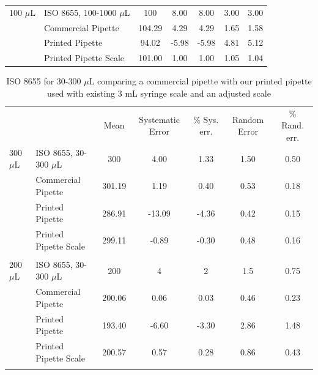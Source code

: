 \documentclass{naturegraphicx}
\begin{document}
\begin{table}
\begin{adjustwidth}{-0.75in}{-1.0in}
\begin{tabular}{llccccc}
100 $\mu$L  & ISO 8655, 100-1000 $\mu$L & 100     & 8.00             & 8.00         & 3.00         & 3.00          \\
& Commercial Pipette    & 104.29  & 4.29             & 4.29         & 1.65         & 1.58          \\
& Printed Pipette       & 94.02   & -5.98            & -5.98        & 4.81         & 5.12          \\
& Printed Pipette Scale & 101.00  & 1.00             & 1.00         & 1.05         & 1.04         
\end{tabular}
\end{adjustwidth}
\end{table}

\begin{table}
\begin{adjustwidth}{-0.75in}{-1.0in}
\centering
\caption{ISO 8655 for 30-300 $\mu$L comparing a commercial pipette with our printed pipette used with existing 3 mL syringe scale and an adjusted scale}
\label{table4}
\begin{tabular}{llccccc}
&                       & Mean   & Systematic Error & \% Sys. err. & Random Error & \% Rand. err. \\
300 $\mu$L & ISO 8655, 30-300 $\mu$L   & 300    & 4.00             & 1.33         & 1.50         & 0.50          \\
& Commercial Pipette    & 301.19 & 1.19             & 0.40         & 0.53         & 0.18          \\
& Printed Pipette       & 286.91 & -13.09           & -4.36        & 0.42         & 0.15          \\
& Printed Pipette Scale & 299.11 & -0.89            & -0.30        & 0.48         & 0.16          \\
&                       &        &                  &              &              &               \\
200 $\mu$L & ISO 8655, 30-300 $\mu$L   & 200    & 4                & 2            & 1.5          & 0.75          \\
& Commercial Pipette    & 200.06 & 0.06             & 0.03         & 0.46         & 0.23          \\
& Printed Pipette       & 193.40 & -6.60            & -3.30        & 2.86         & 1.48          \\
& Printed Pipette Scale & 200.57 & 0.57             & 0.28         & 0.86         & 0.43          \\
&                       &        &                  &              &              &               \\

\end{tabular}
\end{adjustwidth}
\end{table}
\end{document}
